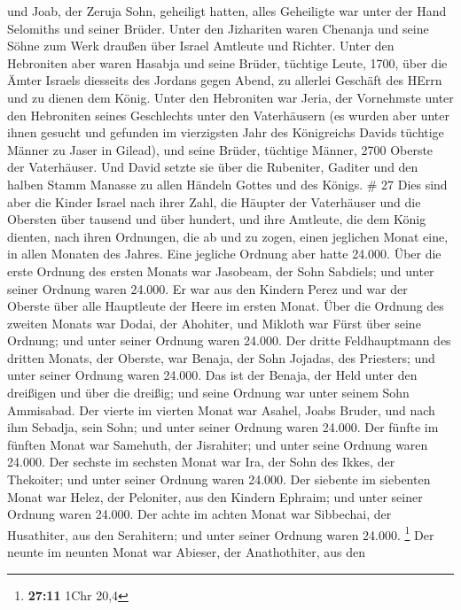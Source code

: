 und Joab, der Zeruja Sohn, geheiligt hatten, alles Geheiligte war unter
der Hand Selomiths und seiner Brüder.  Unter den Jizhariten
waren Chenanja und seine Söhne zum Werk draußen über Israel Amtleute und
Richter.  Unter den Hebroniten aber waren Hasabja und seine
Brüder, tüchtige Leute, 1700, über die Ämter Israels diesseits des
Jordans gegen Abend, zu allerlei Geschäft des HErrn und zu dienen dem
König.  Unter den Hebroniten war Jeria, der Vornehmste
unter den Hebroniten seines Geschlechts unter den Vaterhäusern (es
wurden aber unter ihnen gesucht und gefunden im vierzigsten Jahr des
Königreichs Davids tüchtige Männer zu Jaser in Gilead), 
und seine Brüder, tüchtige Männer, 2700 Oberste der Vaterhäuser. Und
David setzte sie über die Rubeniter, Gaditer und den halben Stamm
Manasse zu allen Händeln Gottes und des Königs. \# 27  Dies
sind aber die Kinder Israel nach ihrer Zahl, die Häupter der Vaterhäuser
und die Obersten über tausend und über hundert, und ihre Amtleute, die
dem König dienten, nach ihren Ordnungen, die ab und zu zogen, einen
jeglichen Monat eine, in allen Monaten des Jahres. Eine jegliche Ordnung
aber hatte 24.000.  Über die erste Ordnung des ersten Monats
war Jasobeam, der Sohn Sabdiels; und unter seiner Ordnung waren 24.000.
 Er war aus den Kindern Perez und war der Oberste über alle
Hauptleute der Heere im ersten Monat.  Über die Ordnung des
zweiten Monats war Dodai, der Ahohiter, und Mikloth war Fürst über seine
Ordnung; und unter seiner Ordnung waren 24.000.  Der dritte
Feldhauptmann des dritten Monats, der Oberste, war Benaja, der Sohn
Jojadas, des Priesters; und unter seiner Ordnung waren 24.000.
 Das ist der Benaja, der Held unter den dreißigen und über
die dreißig; und seine Ordnung war unter seinem Sohn Ammisabad.
 Der vierte im vierten Monat war Asahel, Joabs Bruder, und
nach ihm Sebadja, sein Sohn; und unter seiner Ordnung waren 24.000.
 Der fünfte im fünften Monat war Samehuth, der Jisrahiter;
und unter seine Ordnung waren 24.000.  Der sechste im
sechsten Monat war Ira, der Sohn des Ikkes, der Thekoiter; und unter
seiner Ordnung waren 24.000.  Der siebente im siebenten
Monat war Helez, der Peloniter, aus den Kindern Ephraim; und unter
seiner Ordnung waren 24.000.  Der achte im achten Monat war
Sibbechai, der Husathiter, aus den Serahitern; und unter seiner Ordnung
waren 24.000. \footnote{\textbf{27:11} 1Chr 20,4}  Der
neunte im neunten Monat war Abieser, der Anathothiter, aus den
